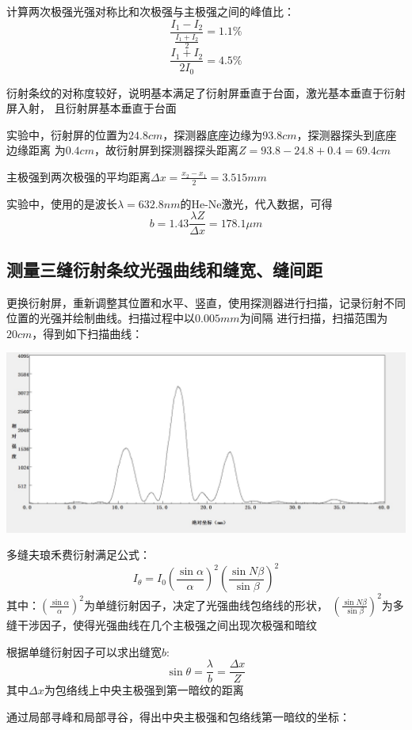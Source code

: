 \documentclass{article}
\begin{document}
    计算两次极强光强对称比和次极强与主极强之间的峰值比：
    $$\frac{I_1-I_2}{\frac{I_1+I_2}{2}}=1.1\% $$
    $$\frac{I_1+I_2}{2I_0}=4.5\%$$
    
    衍射条纹的对称度较好，说明基本满足了衍射屏垂直于台面，激光基本垂直于衍射屏入射，
    且衍射屏基本垂直于台面

    实验中，衍射屏的位置为$24.8cm$，探测器底座边缘为$93.8cm$，探测器探头到底座边缘距离
    为$0.4cm$，故衍射屏到探测器探头距离$Z=93.8-24.8+0.4=69.4cm$

    主极强到两次极强的平均距离$\Delta x = \frac{x_2-x_1}{2}=3.515mm$

    实验中，使用的是波长$\lambda=632.8nm$的He-Ne激光，代入数据，可得
    $$b=1.43\frac{\lambda Z}{\Delta x}=178.1\mu m$$

    \subsection{测量三缝衍射条纹光强曲线和缝宽、缝间距}
    更换衍射屏，重新调整其位置和水平、竖直，使用探测器进行扫描，记录衍射不同位置的光强并绘制曲线。扫描过程中以$0.005mm$为间隔
    进行扫描，扫描范围为$20cm$，得到如下扫描曲线：

    \includegraphics[scale=0.44]{trible.jpg}
    \vspace{2ex}

    多缝夫琅禾费衍射满足公式：
    $$I_\theta = I_0 (\frac{\sin \alpha}{\alpha})^2 (\frac{\sin N\beta}{\sin \beta})^2$$
    其中：$(\frac{\sin \alpha}{\alpha})^2$为单缝衍射因子，决定了光强曲线包络线的形状，
    $(\frac{\sin N\beta}{\sin \beta})^2$为多缝干涉因子，使得光强曲线在几个主极强之间出现次极强和暗纹

    根据单缝衍射因子可以求出缝宽$b$:
    $$\sin \theta = \frac{\lambda}{b} = \frac{\Delta x}{Z}$$
    其中$\Delta x $为包络线上中央主极强到第一暗纹的距离

    通过局部寻峰和局部寻谷，得出中央主极强和包络线第一暗纹的坐标：
\end{document}
